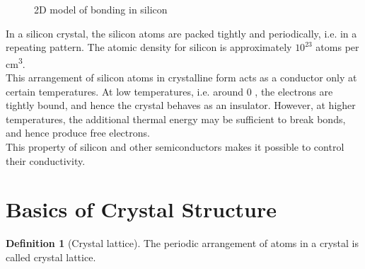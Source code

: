 \documentclass[titlepage, fleqn, a4paper, 12pt, twoside]{article}
\theoremstyle{definition}
\newtheorem{definition}{Definition}
\theoremstyle{theorem}
\begin{document}
\begin{figure}[h]
	\centering
	\caption{2D model of bonding in silicon}
\end{figure}

In a silicon crystal, the silicon atoms are packed tightly and periodically, i.e. in a repeating pattern.
The atomic density for silicon is approximately $10^{23}$ atoms per \si{\cubic\centi\metre}.\\
This arrangement of silicon atoms in crystalline form acts as a conductor only at certain temperatures.
At low temperatures, i.e. around 0 \kelvin, the electrons are tightly bound, and hence the crystal behaves as an insulator.
However, at higher temperatures, the additional thermal energy may be sufficient to break bonds, and hence produce free electrons.\\
This property of silicon and other semiconductors makes it possible to control their conductivity.

\section{Basics of Crystal Structure}

\begin{definition}[Crystal lattice]
	The periodic arrangement of atoms in a crystal is called crystal lattice.
\end{definition}
\end{document}
